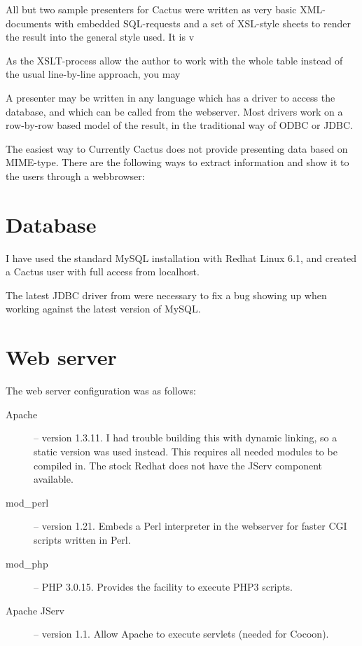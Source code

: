 All but two sample presenters for Cactus were written as very basic
XML-documents with embedded SQL-requests and a set of XSL-style sheets
to render the result into the general style used.  It is v

As the XSLT-process
allow the author to work with the whole table instead of the usual
line-by-line approach, you may




A presenter may be written in any language
which has a driver to access the database, and which can be called
from the webserver.   Most drivers work on a row-by-row based model of
the result, in the traditional way of ODBC or JDBC.

The easiest way to 
Currently Cactus does not provide presenting data based on
MIME-type.  There are the following ways to extract
information and show it to the users through a webbrowser:


\section{Database}

I have used the standard MySQL installation with Redhat Linux 6.1, and
created a Cactus user with full access from localhost.

The latest JDBC driver from  were necessary to fix a bug showing up when working
  against the latest version of MySQL.


\section{Web server}

The web server configuration was as follows:

\begin{description}

\item[Apache] -- version 1.3.11.  I had trouble building this with
  dynamic linking, so a static version was used instead.  This
  requires all needed modules to be compiled in.  The stock Redhat
  does not have the JServ component available.

\item[mod_perl] -- version 1.21.   Embeds a Perl interpreter in the
  webserver for faster CGI scripts written in Perl. 

\item[mod_php] -- PHP 3.0.15.  Provides the facility to execute PHP3
    scripts. 
  \item[Apache JServ] -- version 1.1.  Allow Apache to execute
    servlets (needed for Cocoon).
\end{description}
  
